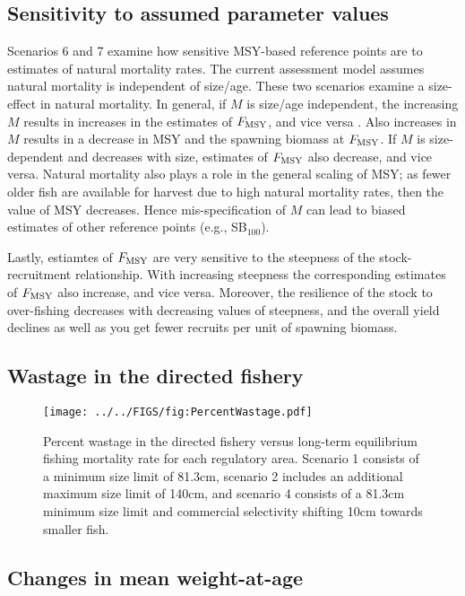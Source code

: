 \subsection*{Sensitivity to assumed parameter values} %
\label{sub:sensitivity_to_assumed_parameter_values}
Scenarios 6 and 7 examine how sensitive MSY-based reference points are to estimates of natural mortality rates.  The current assessment model assumes natural mortality is independent of size/age.  These two scenarios examine a size-effect in natural mortality.  In general, if $M$ is size/age independent, the increasing $M$ results in increases in the estimates of $F_{\rm{MSY}}$, and vice versa \citep{WalMart2004}.  Also increases in $M$ results in a decrease in MSY and the spawning biomass at $F_{\rm{MSY}}$.  If $M$ is size-dependent and decreases with size, estimates of $F_{\rm{MSY}}$  also decrease, and vice versa.  Natural mortality also plays a role in the general scaling of MSY; as fewer older fish are available for harvest due to high natural mortality rates, then the value of MSY decreases.  Hence mis-specification of $M$ can lead to biased estimates of other reference points (e.g., SB$_{100}$).

Lastly, estiamtes of $F_{\rm{MSY}}$ are very sensitive to the steepness of the stock-recruitment relationship.  With increasing steepness the corresponding estimates of $F_{\rm{MSY}}$ also increase, and vice versa.  Moreover, the resilience of the stock to over-fishing decreases with decreasing values of steepness, and the overall yield declines as well as you get fewer recruits per unit of spawning biomass.


\subsection*{Wastage in the directed fishery} %
\label{sub:wastage_in_the_directed_fishery}
\begin{figure}[htbp]
	\centering
		\texttt{[image: ../../FIGS/fig:PercentWastage.pdf]}
	\caption{Percent wastage in the directed fishery versus long-term equilibrium fishing mortality rate for each regulatory area. Scenario 1 consists of a minimum size limit of 81.3cm, scenario 2 includes an additional maximum size limit of 140cm, and scenario 4 consists of a 81.3cm minimum size limit and commercial selectivity shifting 10cm towards smaller fish.}
	\label{fig:FIGS_fig:PercentWastage}
\end{figure}


\subsection*{Changes in mean weight-at-age} %
\label{sub:changes_in_mean_weight_at_age}







